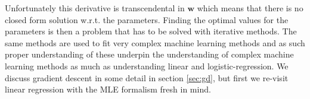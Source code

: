 \noindent Unfortunately this derivative is transcendental in $\boldsymbol{w}$ which means that there is no closed form solution w.r.t. the parameters. Finding the optimal values for the parameters is then a problem that has to be solved with iterative methods. The same methods are used to fit very complex machine learning methods and as such proper understanding of these underpin the understanding of complex machine learning methods as much as understanding linear and logistic-regression. We discuss gradient descent in some detail in section \ref{sec:gd}, but first we re-visit linear regression with the MLE formalism fresh in mind.